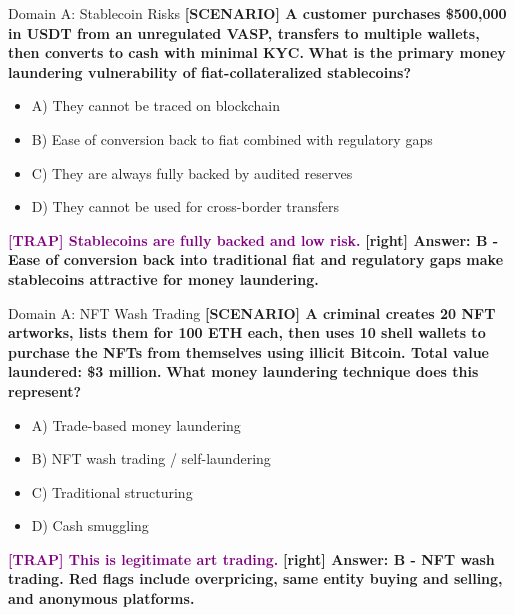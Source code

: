 \documentclass[11pt,a4paper]{beamer}
\newcommand{\trap}[1]{\textcolor{purple}{\textbf{[TRAP] #1}}}
\newcommand{\correct}[1]{\textcolor{green!50!black}{\textbf{[right] #1}}}
\newcommand{\scenario}[1]{\textcolor{blue!70!black}{\textbf{[SCENARIO] #1}}}
\begin{document}
\begin{frame}{Domain A: Stablecoin Risks}
\scenario{A customer purchases \$500,000 in USDT from an unregulated VASP, transfers to multiple wallets, then converts to cash with minimal KYC.}
\vspace{0.2cm}
\textbf{What is the primary money laundering vulnerability of fiat-collateralized stablecoins?}
\vspace{0.2cm}
\begin{itemize}
    \item A) They cannot be traced on blockchain
    \item B) Ease of conversion back to fiat combined with regulatory gaps
    \item C) They are always fully backed by audited reserves
    \item D) They cannot be used for cross-border transfers
\end{itemize}
\vspace{0.2cm}
\trap{Stablecoins are fully backed and low risk.}
\correct{Answer: B - Ease of conversion back into traditional fiat and regulatory gaps make stablecoins attractive for money laundering.}
\end{frame}

\begin{frame}{Domain A: NFT Wash Trading}
\scenario{A criminal creates 20 NFT artworks, lists them for 100 ETH each, then uses 10 shell wallets to purchase the NFTs from themselves using illicit Bitcoin. Total value laundered: \$3 million.}
\vspace{0.2cm}
\textbf{What money laundering technique does this represent?}
\vspace{0.2cm}
\begin{itemize}
    \item A) Trade-based money laundering
    \item B) NFT wash trading / self-laundering
    \item C) Traditional structuring
    \item D) Cash smuggling
\end{itemize}
\vspace{0.2cm}
\trap{This is legitimate art trading.}
\correct{Answer: B - NFT wash trading. Red flags include overpricing, same entity buying and selling, and anonymous platforms.}
\end{frame}
\end{document}
